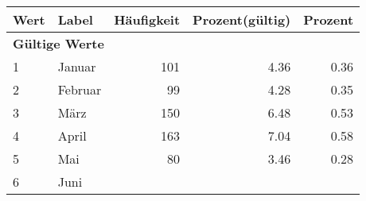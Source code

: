      \begin{longtable}{lXrrr}
     \toprule
     \textbf{Wert} & \textbf{Label} & \textbf{Häufigkeit} & \textbf{Prozent(gültig)} & \textbf{Prozent} \\
     \endhead
     \midrule
     \multicolumn{5}{l}{\textbf{Gültige Werte}}\\

     1 &
     \multicolumn{1}{X}{ Januar   } &


       \num{101} &
       \num[round-mode=places,round-precision=2]{4.36} &
         \num[round-mode=places,round-precision=2]{0.36} \\

     2 &
     \multicolumn{1}{X}{ Februar   } &


       \num{99} &
       \num[round-mode=places,round-precision=2]{4.28} &
         \num[round-mode=places,round-precision=2]{0.35} \\

     3 &
     \multicolumn{1}{X}{ März   } &


       \num{150} &
       \num[round-mode=places,round-precision=2]{6.48} &
         \num[round-mode=places,round-precision=2]{0.53} \\

     4 &
     \multicolumn{1}{X}{ April   } &


       \num{163} &
       \num[round-mode=places,round-precision=2]{7.04} &
         \num[round-mode=places,round-precision=2]{0.58} \\

     5 &
     \multicolumn{1}{X}{ Mai   } &


       \num{80} &
       \num[round-mode=places,round-precision=2]{3.46} &
         \num[round-mode=places,round-precision=2]{0.28} \\

     6 &
     \multicolumn{1}{X}{ Juni   } &



\end{longtable}
